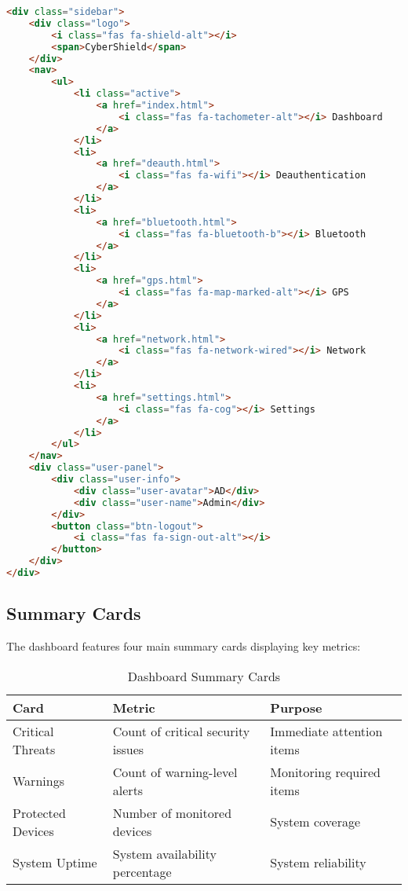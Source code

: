 \documentclass[12pt,a4paper]{report}
\begin{document}
\begin{lstlisting}[language=HTML, caption=Navigation Sidebar Structure]
<div class="sidebar">
    <div class="logo">
        <i class="fas fa-shield-alt"></i>
        <span>CyberShield</span>
    </div>
    <nav>
        <ul>
            <li class="active">
                <a href="index.html">
                    <i class="fas fa-tachometer-alt"></i> Dashboard
                </a>
            </li>
            <li>
                <a href="deauth.html">
                    <i class="fas fa-wifi"></i> Deauthentication
                </a>
            </li>
            <li>
                <a href="bluetooth.html">
                    <i class="fas fa-bluetooth-b"></i> Bluetooth
                </a>
            </li>
            <li>
                <a href="gps.html">
                    <i class="fas fa-map-marked-alt"></i> GPS
                </a>
            </li>
            <li>
                <a href="network.html">
                    <i class="fas fa-network-wired"></i> Network
                </a>
            </li>
            <li>
                <a href="settings.html">
                    <i class="fas fa-cog"></i> Settings
                </a>
            </li>
        </ul>
    </nav>
    <div class="user-panel">
        <div class="user-info">
            <div class="user-avatar">AD</div>
            <div class="user-name">Admin</div>
        </div>
        <button class="btn-logout">
            <i class="fas fa-sign-out-alt"></i>
        </button>
    </div>
</div>
\end{lstlisting}

\subsection{Summary Cards}

The dashboard features four main summary cards displaying key metrics:

\begin{table}[H]
\centering
\begin{tabular}{|l|l|l|}
\hline
\textbf{Card} & \textbf{Metric} & \textbf{Purpose} \\
\hline
Critical Threats & Count of critical security issues & Immediate attention items \\
\hline
Warnings & Count of warning-level alerts & Monitoring required items \\
\hline
Protected Devices & Number of monitored devices & System coverage \\
\hline
System Uptime & System availability percentage & System reliability \\
\hline
\end{tabular}
\caption{Dashboard Summary Cards}
\end{table}
\end{document}
